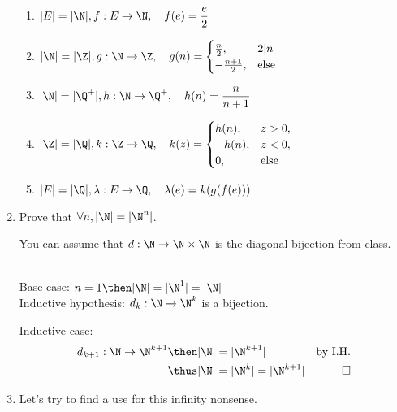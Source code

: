 \documentclass[basic, header]{nosvagor-notes}
\begin{document}
\begin{enumerate}[itemsep=4em]
\begin{enumerate}[leftmargin=2em]
      \item \(\displaystyle |E| = |\N|, f: E \to \N, \quad f(e) = \frac{e}{2} \)

      \item \(\displaystyle |\N| = |\Z|, g: \N \to \Z, \quad g(n) =
        \begin{cases}
          \frac{n}{2},			& 2|n \\
          -\frac{n+1}{2}, & \text{else}
        \end{cases}\)

      \item \(\displaystyle |\N| = |\Q^+|, h: \N \to \Q^+, \quad h(n) = \frac{n}{n+1}\)

      \item \(\displaystyle |\Z| = |\Q|, k: \Z \to \Q, \quad k(z) =
        \begin{cases}
          h(n),			& z >0, \\
          -h(n),			& z < 0, \\
          0, & \text{else}
        \end{cases}\)

      \item \(\displaystyle |E| = |\Q|, \lambda: E \to \Q, \quad \lambda(e) = k(g(f(e)))\)

    \end{enumerate}

  \newpage %

  \item Prove that \(\displaystyle \forall n, |\N| = |\N^n|\).

    You can assume that \(d : \N \to \N \times \N\) is the diagonal bijection
    from class.

    \\
    Base case: \(n = 1 \then |\N| = |\N^1| = |\N|\) \\
    Inductive hypothesis: \(\displaystyle
    d_k : \N \to \N^k
    \) is a bijection.

    Inductive case:
    \begin{align*}
      d_{k+1} : \N \to \N^{k+1}
      \then |\N|
      &= |\N^{k+1}| & \text{by I.H.} \\
      \thus |\N| &= |\N^k| = |\N^{k+1} |
      & \qed
    \end{align*}

  \item Let's try to find a use for this infinity nonsense.


\end{enumerate}
\end{document}
